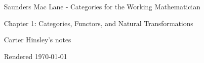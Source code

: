 \documentclass[a4paper]{article}
\begin{document}
\begin{center}
\LARGE{Saunders Mac Lane - Categories for the Working Mathematician}

\Large{Chapter 1: Categories, Functors, and Natural Transformations}

\large{Carter Hinsley's notes}

Rendered \today
\end{center}
\end{document}

